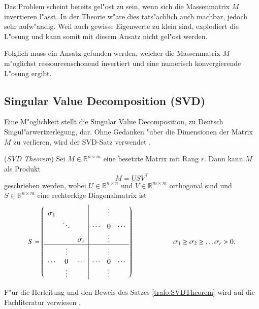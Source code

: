 \begin{refsection}
Das Problem scheint bereits gel"ost zu sein, wenn sich die Massenmatrix $M$ invertieren l"asst. In der Theorie w"are dies tats"achlich auch machbar, jedoch sehr aufw"andig. Weil auch gewisse Eigenwerte zu klein sind, explodiert die L"osung und kann somit mit diesem Ansatz nicht gel"ost werden.

Folglich muss ein Ansatz gefunden werden, welcher die Massenmatrix $M$ m"oglichst ressourcenschonend invertiert und eine numerisch konvergierende L"osung ergibt. 


\subsection{Singular Value Decomposition (SVD) }
Eine M"oglichkeit stellt die Singular Value Decomposition, zu Deutsch Singul"arwertzerlegung, dar. Ohne Gedanken "uber die Dimensionen der Matrix $M$ zu verlieren, wird der SVD-Satz verwendet \cite{trafo:Watkins}. 

\begin{satz}
	\label{trafo:SVDTheorem}
	(\textit{SVD Theorem}) Sei $M\in \mathbb{R}^{n \times m}$ eine besetzte Matrix mit Rang $r$. Dann kann $M$ als Produkt
	\begin{equation}
		M = USV^\top
		\label{trafo:svd}
	\end{equation} 
	geschrieben werden, wobei $U \in \mathbb{R}^{n \times n}$ und $V \in \mathbb{R}^{m \times m}$ orthogonal sind und $S \in \mathbb{R}^{n \times m}$ eine rechteckige Diagonalmatrix ist 
	\begin{equation*}
		S = \left( 
			\begin{array}{ccc|ccc}
				\sigma_1 &          &          &        & \vdots &        \\
				& \ddots   &          & \cdots & 0      & \cdots \\
				&          & \sigma_r &        & \vdots &        \\
				\hline
				&  \vdots  &          &        & \vdots &        \\
				\cdots   &  0       & \cdots   & \cdots & 0      & \cdots \\
				&  \vdots  &          &        & \vdots &   \\				
				\end{array}
			\right) 
			\hspace{2cm}\sigma_1 \geq \sigma_2 \geq \dots \sigma_r > 0. 
	\end{equation*}
\end{satz}
F"ur die Herleitung und den Beweis des Satzes \ref{trafo:SVDTheorem} wird auf die Fachliteratur verwiesen \cite{trafo:Watkins}.


\end{refsection}
